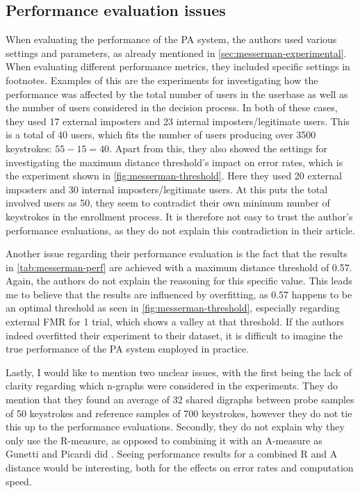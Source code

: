 \documentclass[informationsecurity]{gucmasterproject}
\begin{document}
\subsection{Performance evaluation issues}
When evaluating the performance of the PA system, the authors used various settings and parameters, as already mentioned in \autoref{sec:messerman-experimental}.
When evaluating different performance metrics, they included specific settings in footnotes.
Examples of this are the experiments for investigating how the performance was affected by the total number of users in the userbase as well as the number of users considered in the decision process.
In both of these cases, they used 17 external imposters and 23 internal imposters/legitimate users.
This is a total of 40 users, which fits the number of users producing over 3500 keystrokes: $55-15=40$.
Apart from this, they also showed the settings for investigating the maximum distance threshold's impact on error rates, which is the experiment shown in \autoref{fig:messerman-threshold}.
Here they used 20 external imposters and 30 internal imposters/legitimate users.
At this puts the total involved users as 50, they seem to contradict their own minimum number of keystrokes in the enrollment process.
It is therefore not easy to trust the author's performance evaluations, as they do not explain this contradiction in their article.

Another issue regarding their performance evaluation is the fact that the results in \autoref{tab:messerman-perf} are achieved with a maximum distance threshold of 0.57.
Again, the authors do not explain the reasoning for this specific value.
This leads me to believe that the results are influenced by overfitting, as 0.57 happens to be an optimal threshold as seen in \autoref{fig:messerman-threshold}, especially regarding external FMR for 1 trial, which shows a valley at that threshold.
If the authors indeed overfitted their experiment to their dataset, it is difficult to imagine the true performance of the PA system employed in practice.

Lastly, I would like to mention two unclear issues, with the first being the lack of clarity regarding which n-graphs were considered in the experiments.
They do mention that they found an average of 32 shared digraphs between probe samples of 50 keystrokes and reference samples of 700 keystrokes, however they do not tie this up to the performance evaluations.
Secondly, they do not explain why they only use the R-measure, as opposed to combining it with an A-measure as Gunetti and Picardi did \cite{gnp}.
Seeing performance results for a combined R and A distance would be interesting, both for the effects on error rates and computation speed.
\end{document}

